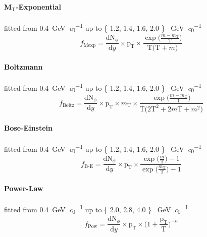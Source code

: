 \paragraph{M$_{\text{T}}$-Exponential} fitted from \SI{0.4}{\giga\electronvolt\per\clight} up to \{ 1.2, 1.4, 1.6, 2.0 \} \SI{}{\giga\electronvolt\per\clight}
\begin{equation}
f_{\text{Mexp}} = \frac{\text{dN}_{\phi}}{\text{d}y}\times\text{p}_{\text{T}}\times\frac{\exp\Big(\frac{m-m_{\text{T}}}{\text{T}} \Big)}{\text{T}\Big(\text{T}+m\Big)}
\label{eq:mtexp}
\end{equation}

\paragraph{Boltzmann} fitted from \SI{0.4}{\giga\electronvolt\per\clight} up to \{ 1.2, 1.4, 1.6, 2.0 \} \SI{}{\giga\electronvolt\per\clight}
\begin{equation}
f_{\text{Boltz}} = \frac{\text{dN}_{\phi}}{\text{d}y}\times\text{p}_{\text{T}}\times m_{\text{T}}\times\frac{\exp\Big(\frac{m-m_{\text{T}}}{\text{T}} \Big)}{\text{T}\Big( 2\text{T}^2 + 2m\text{T} + m^2 \Big)}
\label{eq:boltz}
\end{equation}

\paragraph{Bose-Einstein} fitted from \SI{0.4}{\giga\electronvolt\per\clight} up to \{ 1.2, 1.4, 1.6, 2.0 \} \SI{}{\giga\electronvolt\per\clight}
\begin{equation}
f_{\text{B-E}} = \frac{\text{dN}_{\phi}}{\text{d}y}\times\text{p}_{\text{T}}\times\frac{\exp\Big(\frac{m}{\text{T}} \Big)-1}{\exp\Big(\frac{m_{\text{T}}}{\text{T}} \Big)-1}
\label{eq:bosein}
\end{equation}

\paragraph{Power-Law} fitted from \SI{0.4}{\giga\electronvolt\per\clight} up to \{ 2.0, 2.8, 4.0 \} \SI{}{\giga\electronvolt\per\clight}
\begin{equation}
f_{\text{Pow}} = \frac{\text{dN}_{\phi}}{\text{d}y}\times\text{p}_{\text{T}}\times\Big( 1 + \frac{\text{p}_{\text{T}}}{\text{T}} \Big)^{-n}
\label{eq:pow}
\end{equation}